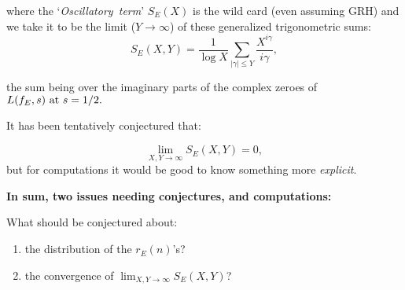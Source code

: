 \documentclass[12pt]{beamer}
\theoremstyle{definition}
\begin{document}
 \begin{frame}\vskip20pt
{\Large  \vskip20pt
where the `{\rm{\it  Oscillatory\ term}}'  $S_E(X) $ is the wild card (even assuming GRH) and we take it to be the limit  ($Y \to {\infty}$) of these generalized trigonometric sums:  \vskip20pt
 $$S_E(X,Y) = {\frac{1}{\log X}}\sum_{|\gamma| \le Y}{\frac{X^{i\gamma}}{i\gamma}},$$
}\end{frame}


 \begin{frame}\vskip20pt
{\Large  \vskip20pt  the sum being over the imaginary parts of the complex zeroes of  $L(f_E, s)\ {\rm at}\ s=1/2.$}\end{frame}

 \begin{frame}\vskip20pt
{\Large  \vskip20pt
 It has been tentatively conjectured   that:

  $$\lim_{X,Y \to \infty}S_E(X,Y) = 0,$$  but for computations it would be good to know something more {\it explicit}.}\end{frame}

 \begin{frame}\vskip20pt
{\Large  \vskip20pt
{\bf In sum, two issues needing conjectures, and computations:}
 \vskip20pt

 What should be conjectured about:

 \begin{enumerate}\item  the distribution of the $r_E(n)$'s?

 \vskip20pt \item the convergence of $\lim_{X,Y \to \infty}S_E(X,Y)$?\end{enumerate}}\end{frame}
\end{document}
